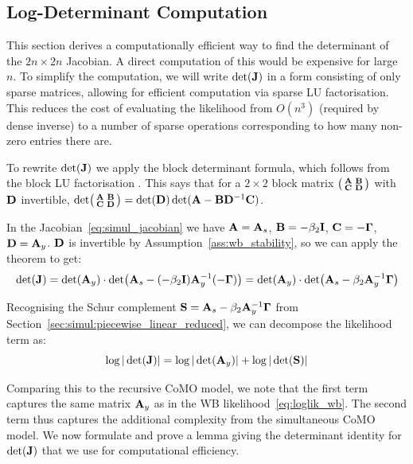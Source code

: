 \subsection{Log-Determinant Computation}
\label{sec:simul:logdet}
This section derives a computationally efficient way to find the determinant of the $2n \times 2n$ Jacobian. A direct computation of this would be expensive for large $n$. To simplify the computation, we will write $\det(\mathbf{J})$ in a form consisting of only sparse matrices, allowing for efficient computation via sparse LU factorisation. This reduces the cost of evaluating the likelihood from $O(n^3)$ (required by dense inverse) to a number of sparse operations corresponding to how many non-zero entries there are.

To rewrite $\det(\mathbf{J})$ we apply the block determinant formula, which follows from the block LU factorisation \parencite[Sec.~3.2.11]{GolubVanLoan2013}. This says that for a $2 \times 2$ block matrix $\bigl(\begin{smallmatrix} \mathbf{A} & \mathbf{B} \\ \mathbf{C} & \mathbf{D} \end{smallmatrix}\bigr)$ with $\mathbf{D}$ invertible, $\det \bigl(\begin{smallmatrix} \mathbf{A} & \mathbf{B} \\ \mathbf{C} & \mathbf{D} \end{smallmatrix}\bigr) = \det(\mathbf{D})\det(\mathbf{A} - \mathbf{B}\mathbf{D}^{-1}\mathbf{C})$.

In the Jacobian~\eqref{eq:simul_jacobian} we have $\mathbf{A} = \mathbf{A}_s$, $\mathbf{B} = -\beta_2\mathbf{I}$, $\mathbf{C} = -\mathbf{\Gamma}$, $\mathbf{D} = \mathbf{A}_y$. $\mathbf{D}$ is invertible by Assumption~\ref{ass:wb_stability}, so we can apply the theorem to get:
\begin{equation}
    \det(\mathbf{J}) = \det(\mathbf{A}_y) \cdot \det\bigl(\mathbf{A}_s - (-\beta_2\mathbf{I})\mathbf{A}_y^{-1}(-\mathbf{\Gamma})\bigr)
    = \det(\mathbf{A}_y) \cdot \det\bigl(\mathbf{A}_s - \beta_2\mathbf{A}_y^{-1}\mathbf{\Gamma}\bigr)
\end{equation}

Recognising the Schur complement $\mathbf{S} = \mathbf{A}_s - \beta_2\mathbf{A}_y^{-1}\mathbf{\Gamma}$ from Section~\ref{sec:simul:piecewise_linear_reduced}, we can decompose the likelihood term as:
\begin{equation}
\label{eq:simul_logdet}
    \log|\det(\mathbf{J})| = \log|\det(\mathbf{A}_y)| + \log|\det(\mathbf{S})|
\end{equation}

Comparing this to the recursive CoMO model, we note that the first term captures the same matrix $\mathbf{A}_y$ as in the WB likelihood~\eqref{eq:loglik_wb}. The second term thus captures the additional complexity from the simultaneous CoMO model. We now formulate and prove a lemma giving the determinant identity for $\det(\mathbf{J})$ that we use for computational efficiency.

